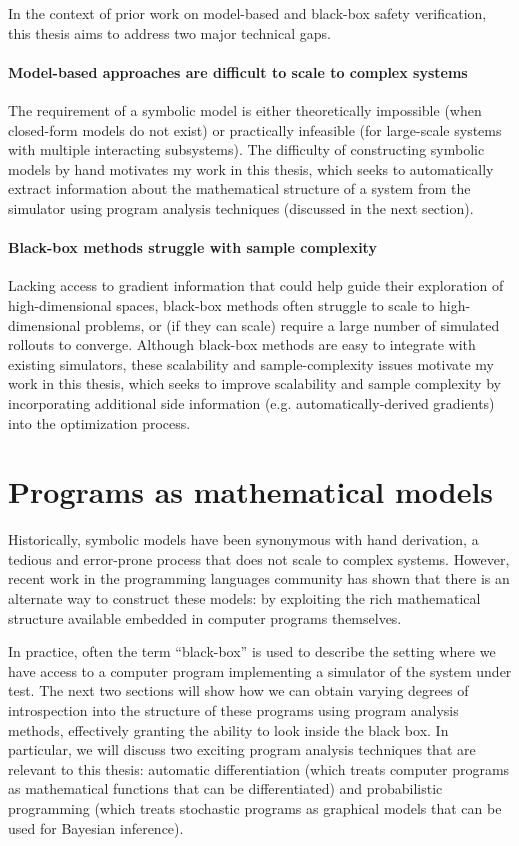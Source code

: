 In the context of prior work on model-based and black-box safety verification, this thesis aims to address two major technical gaps.

\paragraph{Model-based approaches are difficult to scale to complex systems} The requirement of a symbolic model is either theoretically impossible (when closed-form models do not exist) or practically infeasible (for large-scale systems with multiple interacting subsystems). The difficulty of constructing symbolic models by hand motivates my work in this thesis, which seeks to automatically extract information about the mathematical structure of a system from the simulator using program analysis techniques (discussed in the next section).

\paragraph{Black-box methods struggle with sample complexity} Lacking access to gradient information that could help guide their exploration of high-dimensional spaces, black-box methods often struggle to scale to high-dimensional problems, or (if they can scale) require a large number of simulated rollouts to converge. Although black-box methods are easy to integrate with existing simulators, these scalability and sample-complexity issues motivate my work in this thesis, which seeks to improve scalability and sample complexity by incorporating additional side information (e.g. automatically-derived gradients) into the optimization process.

\section{Programs as mathematical models}

Historically, symbolic models have been synonymous with hand derivation, a tedious and error-prone process that does not scale to complex systems. However, recent work in the programming languages community has shown that there is an alternate way to construct these models: by exploiting the rich mathematical structure available embedded in computer programs themselves.

In practice, often the term ``black-box'' is used to describe the setting where we have access to a computer program implementing a simulator of the system under test. The next two sections will show how we can obtain varying degrees of introspection into the structure of these programs using program analysis methods, effectively granting the ability to look inside the black box. In particular, we will discuss two exciting program analysis techniques that are relevant to this thesis: automatic differentiation (which treats computer programs as mathematical functions that can be differentiated) and probabilistic programming (which treats stochastic programs as graphical models that can be used for Bayesian inference).

